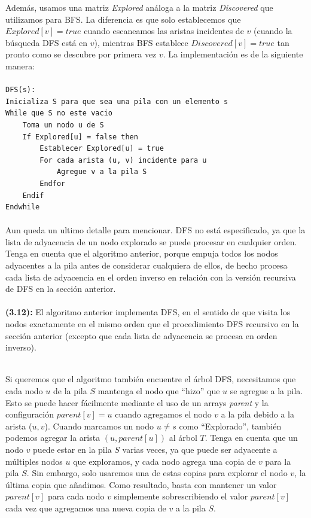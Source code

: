 \documentclass[a4paper, 12pt]{book}
\theoremstyle{dotless}
\begin{document}
Además, usamos una matriz \textit{Explored} análoga a la matriz \textit{Discovered} que utilizamos para BFS. La diferencia es que solo establecemos que \(Explored[v]= true\) cuando escaneamos las aristas incidentes de $v$ (cuando la búsqueda DFS está en $v$), mientras BFS establece \(Discovered[v]=true\) tan pronto como se descubre por primera vez $v$. La implementación es de la siguiente manera:
\paragraph{}
\begin{lstlisting}
DFS(s):
Inicializa S para que sea una pila con un elemento s
While que S no este vacio
	Toma un nodo u de S
	If Explored[u] = false then
		Establecer Explored[u] = true
		For cada arista (u, v) incidente para u
			Agregue v a la pila S
		Endfor
	Endif
Endwhile
\end{lstlisting}
\paragraph{}
Aun queda un ultimo detalle para mencionar. DFS no está especificado, ya que la lista de adyacencia de un nodo explorado se puede procesar en cualquier orden. Tenga en cuenta que el algoritmo anterior, porque empuja todos los nodos adyacentes a la pila antes de considerar cualquiera de ellos, de hecho procesa cada lista de adyacencia en el orden inverso en relación con la versión recursiva de DFS en la sección anterior.\\
\paragraph{}
\colorbox{mygray}{\parbox{15cm}{
	\textbf{(3.12):} El algoritmo anterior implementa DFS, en el sentido de que visita los nodos exactamente en el mismo orden que el procedimiento DFS recursivo en la sección anterior (excepto que cada lista de adyacencia se procesa en orden inverso).}}\\   
Si queremos que el algoritmo también encuentre el árbol DFS, necesitamos que cada nodo $u$ de la pila $S$ mantenga el nodo que ``hizo'' que $u$ se agregue a la pila. Esto se puede hacer fácilmente mediante el uso de un arrays \textit{parent} y la configuración \(parent[v] = u\) cuando agregamos el nodo $v$ a la pila debido a la arista ($u, v$). Cuando marcamos un nodo \(u \neq s\) como ``Explorado'', también podemos agregar la arista \((u, parent[u])\) al árbol $T$. Tenga en cuenta que un nodo $v$ puede estar en la pila $S$ varias veces, ya que puede ser adyacente a múltiples nodos $u$ que exploramos, y cada nodo agrega una copia de $v$ para la pila $S$. Sin embargo, solo usaremos una de estas copias para explorar el nodo $v$, la última copia que añadimos. Como resultado, basta con mantener un valor \(parent[v]\) para cada nodo $v$ simplemente sobrescribiendo el valor \(parent[v]\) cada vez que agregamos una nueva copia de $v$ a la pila $S$.\\
 
\end{document}
